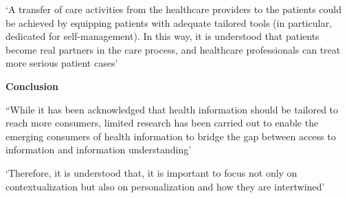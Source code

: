 \documentclass[]{article}
\begin{document}
‘A transfer of care activities from the healthcare providers to the patients could be achieved by equipping patients with adequate tailored tools (in particular, dedicated for self-management). In this way, it is understood that patients become real partners in the care process, and healthcare professionals can treat more serious patient cases’ 

\textbf{Conclusion}

“While it has been acknowledged that health information should be tailored to reach more consumers, limited research has been carried out to enable the emerging consumers of health information to bridge the gap between access to information and information understanding’

‘Therefore, it is understood that, it is important to focus not only on contextualization but also on personalization and how they are intertwined’



	
\end{document}
